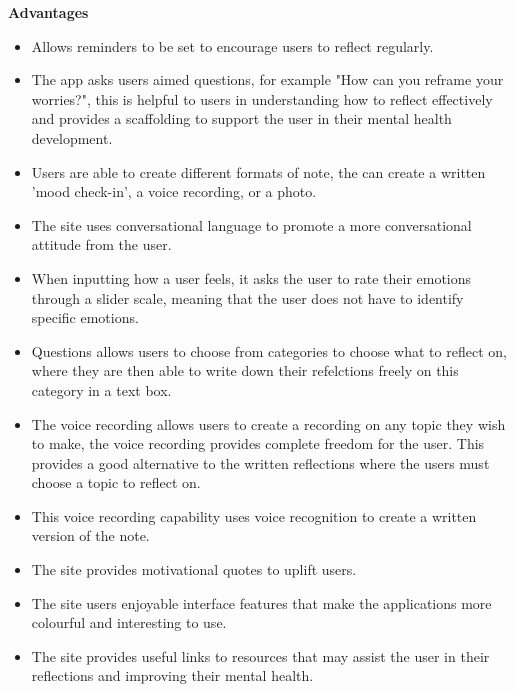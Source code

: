 \documentclass{l4proj}
\begin{document}
\textbf{Advantages}
\begin{itemize}
    \item Allows reminders to be set to encourage users to reflect regularly.
    \item The app asks users aimed questions, for example "How can you reframe your worries?", this is helpful to users in understanding how to reflect effectively
    and provides a scaffolding to support the user in their mental health development.
    \item Users are able to create different formats of note, the can create a written 'mood check-in', a voice recording, or a photo.
    \item The site uses conversational language to promote a more conversational attitude from the user.
    \item When inputting how a user feels, it asks the user to rate their emotions through a slider scale, meaning that the user does not have to identify
    specific emotions. 
    \item Questions allows users to choose from categories to choose what to reflect on, where they are then able to write down their refelctions freely on 
    this category in a text box.
    \item The voice recording allows users to create a recording on any topic they wish to make, the voice recording provides complete freedom for the user. This
    provides a good alternative to the written reflections where the users must choose a topic to reflect on.
    \item This voice recording capability uses voice recognition to create a written version of the note.
    \item The site provides motivational quotes to uplift users.
    \item The site users enjoyable interface features that make the applications more colourful and interesting to use.
    \item The site provides useful links to resources that may assist the user in their reflections and improving their mental health.
\end{itemize}
\end{document}

